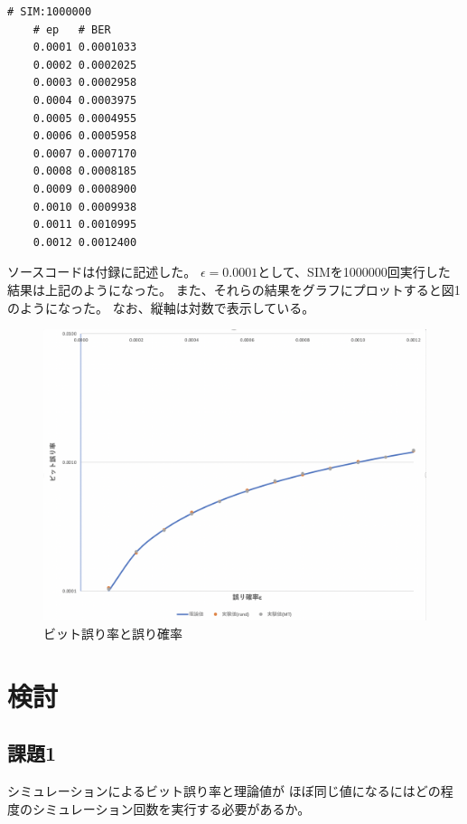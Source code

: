 \documentclass[12pt]{jarticle}
\begin{document}
\clearpage
\begin{lstlisting}[style=log,caption=MTの結果(ep0.0001)]
    # SIM:1000000
    # ep   # BER
    0.0001 0.0001033
    0.0002 0.0002025
    0.0003 0.0002958
    0.0004 0.0003975
    0.0005 0.0004955
    0.0006 0.0005958
    0.0007 0.0007170
    0.0008 0.0008185
    0.0009 0.0008900
    0.0010 0.0009938
    0.0011 0.0010995
    0.0012 0.0012400
\end{lstlisting}

ソースコードは付録に記述した。
$\epsilon=0.0001$として、SIMを1000000回実行した結果は上記のようになった。
また、それらの結果をグラフにプロットすると図1のようになった。
なお、縦軸は対数で表示している。

\begin{figure}[h]
    \begin{center}
        \includegraphics[scale=0.3]{kadai3_1_1.png}
    \end{center}
    \caption{ビット誤り率と誤り確率}
\end{figure}

\section{検討}
\subsection{課題1}
\begin{shadebox}
    シミュレーションによるビット誤り率と理論値が
    ほぼ同じ値になるにはどの程度のシミュレーション回数を実行する必要があるか。
\end{shadebox}
\end{document}
